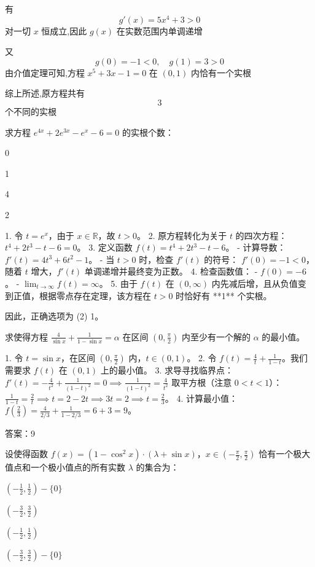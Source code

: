\begin{questions}
\begin{solution}
有
\[
g'(x)=5x^4+3>0
\]
对一切 $x$ 恒成立,因此 $g(x)$ 在实数范围内单调递增

又
\[
g(0)=-1<0,\quad g(1)=3>0
\]
由介值定理可知,方程 $x^5+3x-1=0$ 在 $(0,1)$ 内恰有一个实根

综上所述,原方程共有
\[
3
\]
个不同的实根
\end{solution}

\question 
求方程 $e^{4x} + 2e^{3x} - e^x - 6 = 0$ 的实根个数：
\begin{choices}
    \item 0 \item 1 \item 4 \item 2
\end{choices}

\begin{solution}
1. 令 $t = e^x$，由于 $x \in \mathbb{R}$，故 $t > 0$。
2. 原方程转化为关于 $t$ 的四次方程：$t^4 + 2t^3 - t - 6 = 0$。
3. 定义函数 $f(t) = t^4 + 2t^3 - t - 6$。
   - 计算导数：$f'(t) = 4t^3 + 6t^2 - 1$。
   - 当 $t > 0$ 时，检查 $f'(t)$ 的符号：
     $f'(0) = -1 < 0$，随着 $t$ 增大，$f'(t)$ 单调递增并最终变为正数。
4. 检查函数值：
   - $f(0) = -6$。
   - $\lim_{t \to \infty} f(t) = \infty$。
5. 由于 $f(t)$ 在 $(0, \infty)$ 内先减后增，且从负值变到正值，根据零点存在定理，该方程在 $t > 0$ 时恰好有 **1** 个实根。

因此，正确选项为 (2) 1。
\end{solution}

\question 
求使得方程 $\frac{4}{\sin x} + \frac{1}{1 - \sin x} = \alpha$ 在区间 $(0, \frac{\pi}{2})$ 内至少有一个解的 $\alpha$ 的最小值。

\begin{solution}
1. 令 $t = \sin x$，在区间 $(0, \frac{\pi}{2})$ 内，$t \in (0, 1)$。
2. 令 $f(t) = \frac{4}{t} + \frac{1}{1-t}$。我们需要求 $f(t)$ 在 $(0, 1)$ 上的最小值。
3. 求导寻找临界点：
   $f'(t) = -\frac{4}{t^2} + \frac{1}{(1-t)^2} = 0 \implies \frac{1}{(1-t)^2} = \frac{4}{t^2}$
   取平方根（注意 $0 < t < 1$）：$\frac{1}{1-t} = \frac{2}{t} \implies t = 2 - 2t \implies 3t = 2 \implies t = \frac{2}{3}$。
4. 计算最小值：
   $f(\frac{2}{3}) = \frac{4}{2/3} + \frac{1}{1 - 2/3} = 6 + 3 = 9$。

答案：9
\end{solution}

\question 
设使得函数 $f(x) = (1 - \cos^2 x) \cdot (\lambda + \sin x)$，$x \in (-\frac{\pi}{2}, \frac{\pi}{2})$ 恰有一个极大值点和一个极小值点的所有实数 $\lambda$ 的集合为：
\begin{choices}
    \item $(-\frac{1}{2}, \frac{1}{2}) - \{0\}$ \item $(-\frac{3}{2}, \frac{3}{2})$
    \item $(-\frac{1}{2}, \frac{1}{2})$ \item $(-\frac{3}{2}, \frac{3}{2}) - \{0\}$
\end{choices}


\end{questions}
